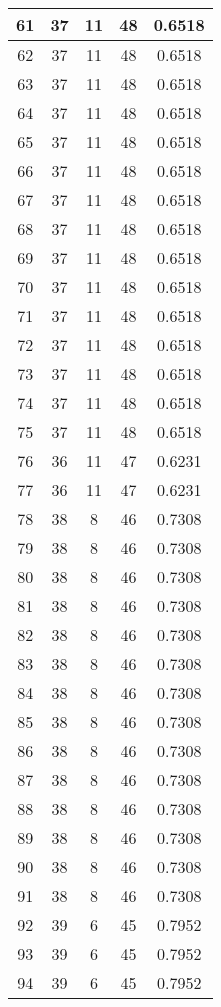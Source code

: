 \documentclass[letterpaper, 12pt]{article}
\begin{document}
\begin{longtable}{|c|c|c|c|c|}
\hline
61 & 37 & 11 & 48 & 0.6518 \\
\hline
62 & 37 & 11 & 48 & 0.6518 \\
\hline
63 & 37 & 11 & 48 & 0.6518 \\
\hline
64 & 37 & 11 & 48 & 0.6518 \\
\hline
65 & 37 & 11 & 48 & 0.6518 \\
\hline
66 & 37 & 11 & 48 & 0.6518 \\
\hline
67 & 37 & 11 & 48 & 0.6518 \\
\hline
68 & 37 & 11 & 48 & 0.6518 \\
\hline
69 & 37 & 11 & 48 & 0.6518 \\
\hline
70 & 37 & 11 & 48 & 0.6518 \\
\hline
71 & 37 & 11 & 48 & 0.6518 \\
\hline
72 & 37 & 11 & 48 & 0.6518 \\
\hline
73 & 37 & 11 & 48 & 0.6518 \\
\hline
74 & 37 & 11 & 48 & 0.6518 \\
\hline
75 & 37 & 11 & 48 & 0.6518 \\
\hline
76 & 36 & 11 & 47 & 0.6231 \\
\hline
77 & 36 & 11 & 47 & 0.6231 \\
\hline
78 & 38 & 8 & 46 & 0.7308 \\
\hline
79 & 38 & 8 & 46 & 0.7308 \\
\hline
80 & 38 & 8 & 46 & 0.7308 \\
\hline
81 & 38 & 8 & 46 & 0.7308 \\
\hline
82 & 38 & 8 & 46 & 0.7308 \\
\hline
83 & 38 & 8 & 46 & 0.7308 \\
\hline
84 & 38 & 8 & 46 & 0.7308 \\
\hline
85 & 38 & 8 & 46 & 0.7308 \\
\hline
86 & 38 & 8 & 46 & 0.7308 \\
\hline
87 & 38 & 8 & 46 & 0.7308 \\
\hline
88 & 38 & 8 & 46 & 0.7308 \\
\hline
89 & 38 & 8 & 46 & 0.7308 \\
\hline
90 & 38 & 8 & 46 & 0.7308 \\
\hline
91 & 38 & 8 & 46 & 0.7308 \\
\hline
92 & 39 & 6 & 45 & 0.7952 \\
\hline
93 & 39 & 6 & 45 & 0.7952 \\
\hline
94 & 39 & 6 & 45 & 0.7952 \\

\end{longtable}
\end{document}
